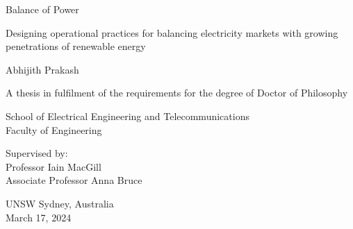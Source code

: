 \documentclass[12pt,a4paper,]{report}
\begin{document}
\begin{titlepage}
    \begin{center}


        \vspace*{2.5cm}

        \huge
        Balance of Power

                \vspace{.5cm}

        \Large
        Designing operational practices for balancing electricity
        markets with growing penetrations of renewable energy
        

        \vspace{1.5cm}

        \Large
        Abhijith Prakash

        \vspace{1.5cm}

        \normalsize
        A thesis in fulfilment of the requirements for the degree of Doctor
of Philosophy

        \vfill

        \normalsize
        School of Electrical Engineering and Telecommunications\\
        Faculty of Engineering\\

        \vfill

        \normalsize
        Supervised by:\\
        Professor Iain MacGill \\ Associate Professor Anna Bruce

        \vspace{0.8cm}


        \normalsize
        UNSW Sydney, Australia\\
        March 17, 2024


    \end{center}
\end{titlepage}
\end{document}
